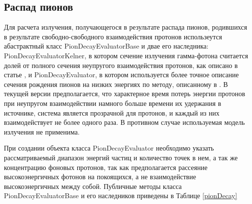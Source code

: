 \subsection{Распад пионов}

Для расчета излучения, получающегося в результате распада пионов, родившихся в результате свободно-свободного взаимодействия протонов использеутся абастрактный класс PionDecayEvaluatorBase и двае его наследника: PionDecayEvaluatorKelner, в котором сечение излучения гамма-фотона считается долей от полного сечения неупругого взаимодействия протонов, как описано в статье \cite{Kelner}, и PionDecayEvaluator, в котором используется более точное описание сечения рождения пионов на низких энергиях по методу, описанному в \cite{Kafexhiu}. В текущей версии предполагается, что характерное время потерь энергии протонов при неупругом взаимодействии намного больше времени их удержания в источнике, система является прозрачной для протонов, и каждый из них взаимодействует не более одного раза. В противном случае используемая модель излучения не применима.

При создании объекта класса PionDecayEvaluator необходимо указать рассматриваемый диапазон энергий частиц и количество точек в нем, а так же концентрацию фоновых протонов, так как предполагается рассеяние высокоэнергичных фотонов на покоящихся, а не взаимодействие высокоэнергичных между собой. Публичные методы класса PionDecayEvaluatorBase и его наследников приведены в Таблице \ref{pionDecay}

